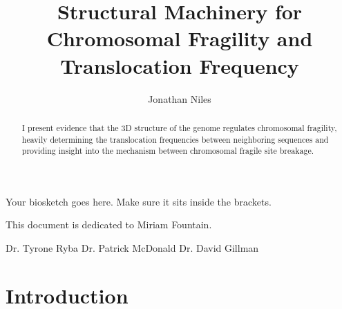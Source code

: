 \documentclass[phd,tocprelim]{cornell}
\title {Structural Machinery for Chromosomal Fragility and Translocation Frequency}
\author {Jonathan Niles}
\begin{document}
\maketitle
\makecopyright

\begin{abstract}
I present evidence that the 3D structure of the genome regulates
chromosomal fragility, heavily determining the translocation
frequencies between neighboring sequences and providing insight
into the mechanism between chromosomal fragile site breakage.
\end{abstract}

\begin{biosketch}
Your biosketch goes here. Make sure it sits inside
the brackets.
\end{biosketch}

\begin{dedication}
This document is dedicated to Miriam Fountain.
\end{dedication}

\begin{acknowledgements}
Dr. Tyrone Ryba
Dr. Patrick McDonald
Dr. David Gillman
\end{acknowledgements}

\contentspage
\tablelistpage
\figurelistpage

\normalspacing \setcounter{page}{1} 
\pagestyle{cornell} \addtolength{\parskip}{0.5\baselineskip}

\chapter{Introduction}
\end{document}
